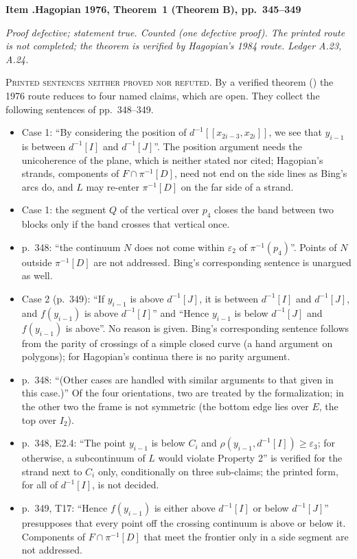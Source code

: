 \documentclass[11pt]{article}
\newcounter{defect}
\newenvironment{defect}[4]{%
  \par\addvspace{10pt}\refstepcounter{defect}%
  \noindent\textbf{Item \thedefect.\enspace #1}\par\nopagebreak
  \noindent\textit{#2}\par\nopagebreak\smallskip}{\par\addvspace{6pt}}
\newcommand{\fld}[1]{\par\noindent\textsc{#1.}\enspace}
\begin{document}
\begin{defect}{Hagopian 1976, Theorem~1 (Theorem B), pp.~345--349}{Proof defective; statement true.
Counted (one defective proof). The printed route is not completed; the theorem is verified by
Hagopian's 1984 route. Ledger A.23, A.24.}{0}{1}
\fld{Printed sentences neither proved nor refuted} By a verified theorem
() the 1976 route reduces to four named claims, which are
open. They collect the following sentences of pp.~348--349.
\begin{itemize}
\item Case 1: ``By considering the position of $d^{-1}[[x_{2i-3},x_{2i}]]$, we see that $y_{i-1}$
  is between $d^{-1}[I]$ and $d^{-1}[J]$''. The position argument needs the unicoherence of the
  plane, which is neither stated nor cited; Hagopian's strands, components of
  $F\cap\pi^{-1}[D]$, need not end on the side lines as Bing's arcs do, and $L$ may re-enter
  $\pi^{-1}[D]$ on the far side of a strand.
\item Case 1: the segment $Q$ of the vertical over $p_4$ closes the band between two blocks only if
  the band crosses that vertical once.
\item p.~348: ``the continuum $N$ does not come within $\varepsilon_2$ of $\pi^{-1}(p_4)$''. Points
  of $N$ outside $\pi^{-1}[D]$ are not addressed. Bing's corresponding sentence \cite[p.~227]{B60}
  is unargued as well.
\item Case 2 (p.~349): ``If $y_{i-1}$ is above $d^{-1}[J]$, it is between $d^{-1}[I]$ and
  $d^{-1}[J]$, and $f(y_{i-1})$ is above $d^{-1}[I]$'' and ``Hence $y_{i-1}$ is below $d^{-1}[J]$
  and $f(y_{i-1})$ is above''. No reason is given. Bing's corresponding sentence follows from the
  parity of crossings of a simple closed curve (a hand argument on polygons); for Hagopian's
  continua there is no parity argument.
\item p.~348: ``(Other cases are handled with similar arguments to that given in this case.)'' Of
  the four orientations, two are treated by the formalization; in the other two the frame is not
  symmetric (the bottom edge lies over $E$, the top over $I_2$).
\item p.~348, E2.4: ``The point $y_{i-1}$ is below $C_i$ and $\rho(y_{i-1},d^{-1}[I])\ge
  \varepsilon_3$; for otherwise, a subcontinuum of $L$ would violate Property 2'' is verified for
  the strand next to $C_i$ only, conditionally on three sub-claims; the printed form, for all of
  $d^{-1}[I]$, is not decided.
\item p.~349, T17: ``Hence $f(y_{i-1})$ is either above $d^{-1}[I]$ or below $d^{-1}[J]$''
  presupposes that every point off the crossing continuum is above or below it. Components of
  $F\cap\pi^{-1}[D]$ that meet the frontier only in a side segment are not addressed.
\end{itemize}


\end{defect}
\end{document}
